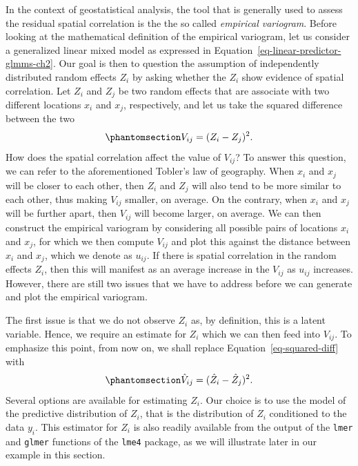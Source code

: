 \documentclass[
  letterpaper,
]{krantz}
\begin{document}
In the context of geostatistical analysis, the tool that is generally
used to assess the residual spatial correlation is the the so called
\emph{empirical variogram}. Before looking at the mathematical
definition of the empirical variogram, let us consider a generalized
linear mixed model as expressed in
Equation~\ref{eq-linear-predictor-glmms-ch2}. Our goal is then to
question the assumption of independently distributed random effects
\(Z_i\) by asking whether the \(Z_i\) show evidence of spatial
correlation. Let \(Z_i\) and \(Z_j\) be two random effects that are
associate with two different locations \(x_i\) and \(x_j\),
respectively, and let us take the squared difference between the two
\begin{equation}\phantomsection\label{eq-squared-diff}{
V_{ij} = (Z_i - Z_j)^2.
}\end{equation} How does the spatial correlation affect the value of
\(V_{ij}\)? To answer this question, we can refer to the aforementioned
Tobler's law of geography. When \(x_i\) and \(x_j\) will be closer to
each other, then \(Z_i\) and \(Z_j\) will also tend to be more similar
to each other, thus making \(V_{ij}\) smaller, on average. On the
contrary, when \(x_i\) and \(x_j\) will be further apart, then
\(V_{ij}\) will become larger, on average. We can then construct the
empirical variogram by considering all possible pairs of locations
\(x_i\) and \(x_j\), for which we then compute \(V_{ij}\) and plot this
against the distance between \(x_i\) and \(x_j\), which we denote as
\(u_{ij}\). If there is spatial correlation in the random effects
\(Z_i\), then this will manifest as an average increase in the
\(V_{ij}\) as \(u_{ij}\) increases. However, there are still two issues
that we have to address before we can generate and plot the empirical
variogram.

The first issue is that we do not observe \(Z_i\) as, by definition,
this is a latent variable. Hence, we require an estimate for \(Z_i\)
which we can then feed into \(V_{ij}\). To emphasize this point, from
now on, we shall replace Equation~\ref{eq-squared-diff} with
\begin{equation}\phantomsection\label{eq-hat-squared-diff}{
\hat{V}_{ij} = (\hat{Z}_{i} - \hat{Z}_j)^2.
}\end{equation} Several options are available for estimating \(Z_{i}\).
Our choice is to use the model of the predictive distribution of
\(Z_i\), that is the distribution of \(Z_{i}\) conditioned to the data
\(y_i\). This estimator for \(Z_i\) is also readily available from the
output of the \texttt{lmer} and \texttt{glmer} functions of the
\texttt{lme4} package, as we will illustrate later in our example in
this section.
\end{document}
